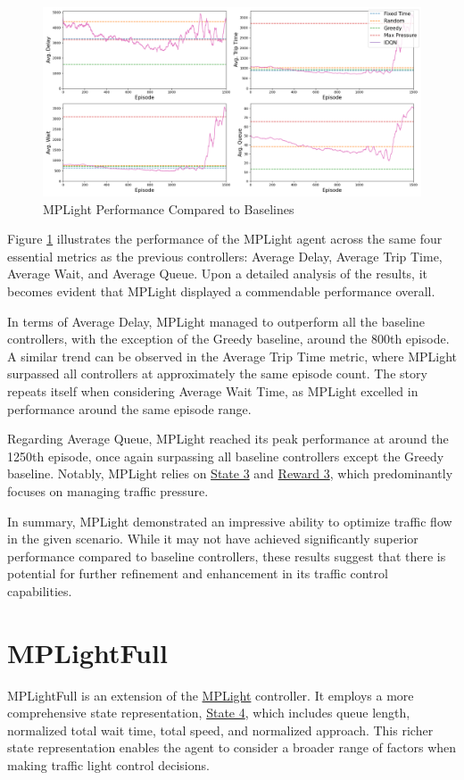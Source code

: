 \begin{figure}[h]
    \centering
    \includegraphics[width=1\linewidth]{images/experiments/MPLight.png}
    \caption{MPLight Performance Compared to Baselines}
    \label{fig:mplight_results}
\end{figure}

Figure \ref{fig:mplight_results} illustrates the performance of the MPLight agent across the same four essential metrics as the previous controllers: Average Delay, Average Trip Time, Average Wait, and Average Queue. Upon a detailed analysis of the results, it becomes evident that MPLight displayed a commendable performance overall.

In terms of Average Delay, MPLight managed to outperform all the baseline controllers, with the exception of the Greedy baseline, around the 800th episode. A similar trend can be observed in the Average Trip Time metric, where MPLight surpassed all controllers at approximately the same episode count. The story repeats itself when considering Average Wait Time, as MPLight excelled in performance around the same episode range.

Regarding Average Queue, MPLight reached its peak performance at around the 1250th episode, once again surpassing all baseline controllers except the Greedy baseline. Notably, MPLight relies on \hyperref[subsec:state-3]{State 3} and \hyperref[subsec:reward-3]{Reward 3}, which predominantly focuses on managing traffic pressure.

In summary, MPLight demonstrated an impressive ability to optimize traffic flow in the given scenario. While it may not have achieved significantly superior performance compared to baseline controllers, these results suggest that there is potential for further refinement and enhancement in its traffic control capabilities.

\section{MPLightFull}
MPLightFull is an extension of the \hyperref[sec:exp-mplight]{MPLight} controller. It employs a more comprehensive state representation, \hyperref[subsec:state-4]{State 4}, which includes queue length, normalized total wait time, total speed, and normalized approach. This richer state representation enables the agent to consider a broader range of factors when making traffic light control decisions.

